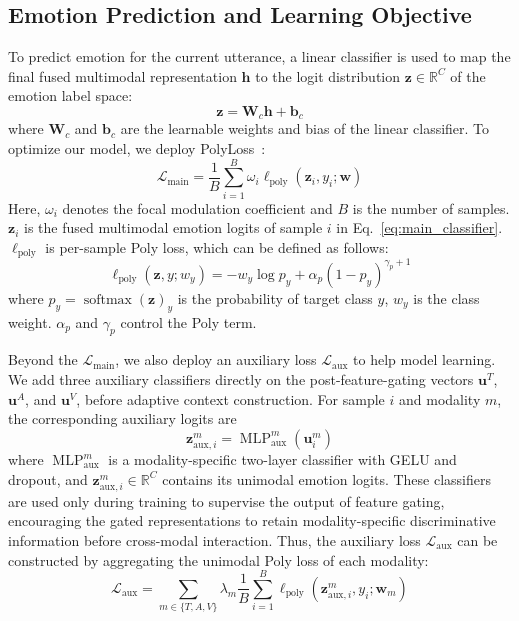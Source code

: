 \documentclass[letterpaper]{article} %
\begin{document}
\subsection{Emotion Prediction and Learning Objective}
To predict emotion for the current utterance, a linear classifier is used to map the final fused multimodal representation $\mathbf{h}$ to the logit distribution $\mathbf{z}\in\mathbb{R}^{C}$ of the emotion label space: 
\begin{equation}
\mathbf{z}=\mathbf{W}_{c}\mathbf{h}+\mathbf{b}_{c}
\label{eq:main_classifier}
\end{equation}
where $\mathbf{W}_{c}$ and $\mathbf{b}_{c}$ are the learnable weights and bias of the linear classifier. 
To optimize our model, we deploy PolyLoss~\cite{polyloss}: 
\begin{equation}
\mathcal{L}_{\mathrm{main}}
=\frac{1}{B}\sum_{i=1}^{B}
  \omega_i
  \ell_{\mathrm{poly}}
  (\mathbf{z}_{i},y_i;\mathbf{w})
\label{eq:main_loss}
\end{equation}
Here, $\omega_i$ denotes the focal modulation coefficient and $B$ is the number of samples. $\mathbf{z}_i$ is the fused multimodal emotion logits of sample $i$ in Eq.~\eqref{eq:main_classifier}. $\ell_{\mathrm{poly}}$ is per-sample Poly loss, which can be defined as follows:
\begin{equation}
\ell_{\mathrm{poly}}(\mathbf{z},y; w_y)
=-w_y\log p_y+\alpha_p(1-p_y)^{\gamma_p+1}
\label{eq:poly_loss}
\end{equation}
where $p_y=\operatorname{softmax}(\mathbf{z})_y$ is the probability of target class $y$, $w_y$ is the class weight. $\alpha_p$ and $\gamma_p$ control the Poly term.

Beyond the $\mathcal{L}_{\mathrm{main}}$, we also deploy an auxiliary loss $\mathcal{L}_{\mathrm{aux}}$ to help model learning. We add three auxiliary classifiers  directly on the post-feature-gating vectors $\mathbf{u}^{T}$, $\mathbf{u}^{A}$, and
$\mathbf{u}^{V}$, before adaptive context construction. For sample $i$ and modality $m$, the corresponding auxiliary logits are 
\begin{equation}
\mathbf{z}_{\mathrm{aux},i}^{m}
=\operatorname{MLP}_{\mathrm{aux}}^{m}
  (\mathbf{u}_{i}^{m})
\label{eq:auxiliary_classifier}
\end{equation}  
where $\operatorname{MLP}_{\mathrm{aux}}^{m}$ is a modality-specific
two-layer classifier with GELU and dropout, and
$\mathbf{z}_{\mathrm{aux},i}^{m}\in\mathbb{R}^{C}$ contains its
unimodal emotion logits. These classifiers are used only during training to supervise the output of feature gating, encouraging the gated representations to retain modality-specific discriminative information before cross-modal interaction. Thus, the auxiliary loss $\mathcal{L}_{\mathrm{aux}}$ can be constructed by aggregating the unimodal Poly loss of each modality:
\begin{equation}
\mathcal{L}_{\mathrm{aux}}
= \sum_{m\in\{T,A,V\}}\lambda_m\frac{1}{B}\sum_{i=1}^{B}
  \ell_{\mathrm{poly}}
  (\mathbf{z}^{m}_{\mathrm{aux},i},y_i;\mathbf{w}_{m})
\label{eq:unimodal_losses}
\end{equation}
\end{document}
